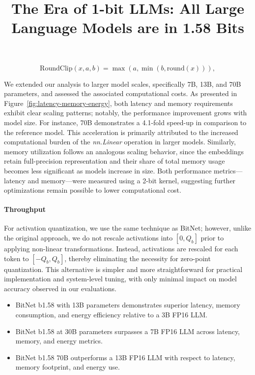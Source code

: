 \title{The Era of 1-bit LLMs: All Large Language Models are in 1.58 Bits}
\begin{equation}
    \mathrm{RoundClip}(x, a, b) = \max(a, \min(b, \mathrm{round}(x))),
\end{equation}

We extended our analysis to larger model scales, specifically 7B, 13B, and 70B parameters, and assessed the associated computational costs. As presented in Figure~\ref{fig:latency-memory-energy}, both latency and memory requirements exhibit clear scaling patterns; notably, the performance improvement grows with model size. For instance,  70B demonstrates a 4.1-fold speed-up in comparison to the  reference model. This acceleration is primarily attributed to the increased computational burden of the \emph{nn.Linear} operation in larger models. Similarly, memory utilization follows an analogous scaling behavior, since the embeddings retain full-precision representation and their share of total memory usage becomes less significant as models increase in size. Both performance metrics—latency and memory—were measured using a 2-bit kernel, suggesting further optimizations remain possible to lower computational cost.

\paragraph{Throughput}

For activation quantization, we use the same technique as BitNet; however, unlike the original approach, we do not rescale activations into $[0, Q_b]$ prior to applying non-linear transformations. Instead, activations are rescaled for each token to $[-Q_b, Q_b]$, thereby eliminating the necessity for zero-point quantization. This alternative is simpler and more straightforward for practical implementation and system-level tuning, with only minimal impact on model accuracy observed in our evaluations.

\begin{itemize}
    \item BitNet b1.58 with 13B parameters demonstrates superior latency, memory consumption, and energy efficiency relative to a 3B FP16 LLM.
    \item BitNet b1.58 at 30B parameters surpasses a 7B FP16 LLM across latency, memory, and energy metrics.
    \item BitNet b1.58 70B outperforms a 13B FP16 LLM with respect to latency, memory footprint, and energy use.
\end{itemize}

